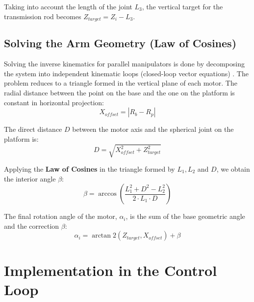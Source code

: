\documentclass[12pt,a4paper]{report}
\begin{document}
Taking into account the length of the joint $L_3$, the vertical target for the transmission rod becomes $Z_{target} = Z_i - L_3$.

\subsection{Solving the Arm Geometry (Law of Cosines)}
Solving the inverse kinematics for parallel manipulators is done by decomposing the system into independent kinematic loops (closed-loop vector equations) \cite{parallel_robot}. The problem reduces to a triangle formed in the vertical plane of each motor. The radial distance between the point on the base and the one on the platform is constant in horizontal projection:
\begin{equation}
    X_{offset} = |R_b - R_p|
\end{equation}

The direct distance $D$ between the motor axis and the spherical joint on the platform is:
\begin{equation}
    D = \sqrt{X_{offset}^2 + Z_{target}^2}
\end{equation}

Applying the \textbf{Law of Cosines} in the triangle formed by $L_1, L_2$ and $D$, we obtain the interior angle $\beta$:
\begin{equation}
    \beta = \arccos\left(\frac{L_1^2 + D^2 - L_2^2}{2 \cdot L_1 \cdot D}\right)
\end{equation}

The final rotation angle of the motor, $\alpha_i$, is the sum of the base geometric angle and the correction $\beta$:
\begin{equation}
    \alpha_i = \arctan2(Z_{target}, X_{offset}) + \beta
\end{equation}

\section{Implementation in the Control Loop}
\label{sec:ik_linear}
\end{document}
